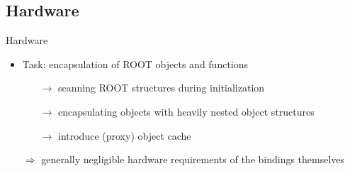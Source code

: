\subsection{Hardware}
\begin{frame}{Hardware}
  \begin{itemize}
    \item Task: encapsulation of ROOT objects and functions
    \begin{itemize}
      \item[$\rightarrow$] \textcolor{kit-blue100}{scanning ROOT structures during initialization}
      \item[$\rightarrow$] \textcolor{kit-blue100}{encapsulating objects with heavily nested object structures}
      \item[$\rightarrow$] \textcolor{kit-green70}{introduce (proxy) object cache}
    \end{itemize}
    \vspace{10mm}
    \pause
    \item[$\Rightarrow$] generally negligible hardware requirements of the bindings themselves
  \end{itemize}
\end{frame}
